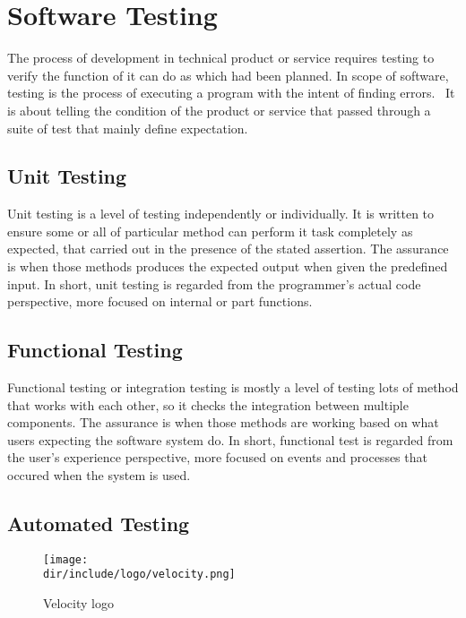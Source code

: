 \section{Software Testing}
\label{sec:software-testing}

The process of development in technical product or service requires testing to verify the function of it can do as which had been planned.
In scope of software, testing is the process of executing a program with the intent of finding errors.~\autocite{Myers:2012:Testing:6}
It is about telling the condition of the product or service that passed through a suite of test that mainly define expectation.

\subsection{Unit Testing}

Unit testing is a level of testing independently or individually.
It is written to ensure some or all of particular method can perform it task completely as expected, that carried out in the presence of the stated assertion.
The assurance is when those methods produces the expected output when given the predefined input.
In short, unit testing is regarded from the programmer's actual code perspective, more focused on internal or part functions.

\subsection{Functional Testing}

Functional testing or integration testing is mostly a level of testing lots of method that works with each other, so it checks the integration between multiple components.
The assurance is when those methods are working based on what users expecting the software system do.
In short, functional test is regarded from the user's experience perspective, more focused on events and processes that occured when the system is used.

\subsection{Automated Testing}

\begin{wrapfigure}{r}{0.5\textwidth}
  \vspace{-20pt}
  \begin{center}
    \texttt{[image: \\dir/include/logo/velocity.png]}
  \end{center}
  \vspace{-20pt}
  \caption{Velocity logo}
  \label{fig:velocity-logo}
  \vspace{-10pt}
\end{wrapfigure}

